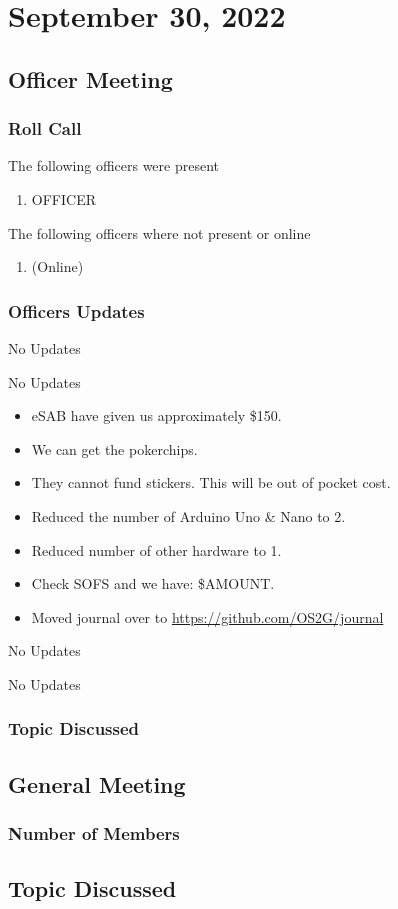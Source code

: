 \section{September 30, 2022}
\subsection{Officer Meeting}

\subsubsection{Roll Call}
The following officers were present

\begin{enumerate}
\item OFFICER
\end{enumerate}

The following officers where not present or online

\begin{enumerate}
    \item \tresurer (Online)
\end{enumerate}

\subsubsection{Officers Updates}

\textbf{\president}

No Updates

\textbf{\vicepresident}

No Updates

\textbf{\tresurer}

\begin{itemize}
    \item eSAB have given us approximately \$150. 
    \item We can get the pokerchips.
    \item They cannot fund stickers. This will be out of pocket cost.
    \item Reduced the number of Arduino Uno \& Nano to 2.
    \item Reduced number of other hardware to 1.
    \item Check SOFS and we have: \$AMOUNT.
    \item Moved journal over to \href{https://github.com/OS2G/journal}{https://github.com/OS2G/journal}
\end{itemize}

\textbf{\primaryprogrammer}

No Updates

\textbf{\secretary}

No Updates

\subsubsection{Topic Discussed}


\subsection{General Meeting}
\subsubsection{Number of Members}
\subsection{Topic Discussed}